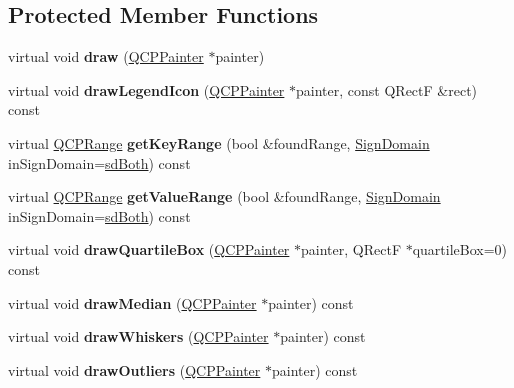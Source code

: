\subsection*{Protected Member Functions}
\begin{DoxyCompactItemize}
\item 
\mbox{\label{class_q_c_p_statistical_box_a753b62761217dd6b92f8a29e286a1317}} 
virtual void {\bfseries draw} (\hyperlink{class_q_c_p_painter}{Q\+C\+P\+Painter} $\ast$painter)
\item 
\mbox{\label{class_q_c_p_statistical_box_a41c6193fd24f5c1b6c754e7bcfe3e174}} 
virtual void {\bfseries draw\+Legend\+Icon} (\hyperlink{class_q_c_p_painter}{Q\+C\+P\+Painter} $\ast$painter, const Q\+RectF \&rect) const
\item 
\mbox{\label{class_q_c_p_statistical_box_ac17d9d68e41be25b7f0e8a47f9a5d225}} 
virtual \hyperlink{class_q_c_p_range}{Q\+C\+P\+Range} {\bfseries get\+Key\+Range} (bool \&found\+Range, \hyperlink{class_q_c_p_abstract_plottable_a661743478a1d3c09d28ec2711d7653d8}{Sign\+Domain} in\+Sign\+Domain=\hyperlink{class_q_c_p_abstract_plottable_a661743478a1d3c09d28ec2711d7653d8a082b98cfb91a7363a3b5cd17b0c1cd60}{sd\+Both}) const
\item 
\mbox{\label{class_q_c_p_statistical_box_a13958798713d4bb58b94e148b409877d}} 
virtual \hyperlink{class_q_c_p_range}{Q\+C\+P\+Range} {\bfseries get\+Value\+Range} (bool \&found\+Range, \hyperlink{class_q_c_p_abstract_plottable_a661743478a1d3c09d28ec2711d7653d8}{Sign\+Domain} in\+Sign\+Domain=\hyperlink{class_q_c_p_abstract_plottable_a661743478a1d3c09d28ec2711d7653d8a082b98cfb91a7363a3b5cd17b0c1cd60}{sd\+Both}) const
\item 
\mbox{\label{class_q_c_p_statistical_box_a699ede353d6a7207d9fb36dd3aabf348}} 
virtual void {\bfseries draw\+Quartile\+Box} (\hyperlink{class_q_c_p_painter}{Q\+C\+P\+Painter} $\ast$painter, Q\+RectF $\ast$quartile\+Box=0) const
\item 
\mbox{\label{class_q_c_p_statistical_box_a642b90dd4ab5ab6e16188a9230401bcc}} 
virtual void {\bfseries draw\+Median} (\hyperlink{class_q_c_p_painter}{Q\+C\+P\+Painter} $\ast$painter) const
\item 
\mbox{\label{class_q_c_p_statistical_box_ae64401aa18b9c45d4d33f9b46cf4bbd0}} 
virtual void {\bfseries draw\+Whiskers} (\hyperlink{class_q_c_p_painter}{Q\+C\+P\+Painter} $\ast$painter) const
\item 
\mbox{\label{class_q_c_p_statistical_box_a8550e16af27b4e05d92bb337fb34324f}} 
virtual void {\bfseries draw\+Outliers} (\hyperlink{class_q_c_p_painter}{Q\+C\+P\+Painter} $\ast$painter) const
\end{DoxyCompactItemize}
